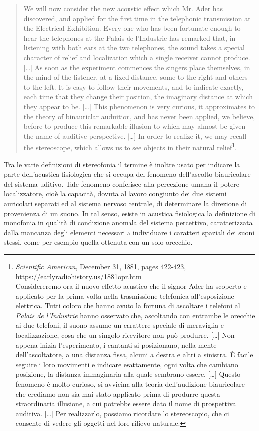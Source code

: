 \begin{quote}
We will now consider the new acoustic effect which Mr. Ader has discovered, and
applied for the first time in the telephonic transmission at the Electrical
Exhibition. Every one who has been fortunate enough to hear the telephones at
the Palais de l'Industrie has remarked that, in listening with both ears at the
two telephones, the sound takes a special character of relief and localization
which a single receiver cannot produce. [\ldots] As soon as the experiment
commences the singers place themselves, in the mind of the listener, at a fixed
distance, some to the right and others to the left. It is easy to follow their
movements, and to indicate exactly, each time that they change their position,
the imaginary distance at which they appear to be. [\ldots] This phenomenon is
very curious, it approximates to the theory of binauriclar auduition, and has
never been applied, we believe, before to produce this remarkable illusion to
which may almost be given the name of auditive perspective. [\ldots] In order
to realize it, we may recall the stereoscope, which allows us to see objects in
their natural relief\footnote{
\emph{Scientific American}, December 31, 1881, pages 422-423,\\
\url{https://earlyradiohistory.us/1881opr.htm} \\
Considereremo ora il nuovo effetto acustico che il signor Ader ha scoperto e
applicato per la prima volta nella trasmissione telefonica all'esposizione
elettrica. Tutti coloro che hanno avuto la fortuna di ascoltare i telefoni al
\emph{Palais de l'Industrie} hanno osservato che, ascoltando con entrambe le
orecchie ai due telefoni, il suono assume un carattere speciale di meraviglia e
localizzazione, cosa che un singolo ricevitore non può produrre. [\ldots] Non
appena inizia l'esperimento, i cantanti si posizionano, nella mente
dell'ascoltatore, a una distanza fissa, alcuni a destra e altri a sinistra. È
facile seguire i loro movimenti e indicare esattamente, ogni volta che cambiano
posizione, la distanza immaginaria alla quale sembrano essere. [\ldots] Questo
fenomeno è molto curioso, si avvicina alla teoria dell'audizione biauricolare che
crediamo non sia mai stato applicato prima di produrre questa straordinaria
illusione, a cui potrebbe essere dato il nome di prospettiva auditiva. [\ldots]
Per realizzarlo, possiamo ricordare lo stereoscopio, che ci consente di vedere
gli oggetti nel loro rilievo naturale.}.
\end{quote}

Tra le varie definizioni di stereofonia il termine è inoltre usato per indicare
la parte dell’acustica fisiologica che si occupa del fenomeno dell'ascolto
biauricolare del sistema uditivo. Tale fenomeno conferisce alla percezione umana
il potere localizzatore, cioè la capacità, dovuta al lavoro congiunto dei due
sistemi auricolari separati ed al sistema nervoso centrale, di determinare la
direzione di provenienza di un suono. In tal senso, esiste in acustica
fisiologica la definizione di monofonia in qualità di condizione anomala del
sistema percettivo, caratterizzata dalla mancanza degli elementi necessari a
individuare i caratteri spaziali dei suoni stessi, come per esempio quella
ottenuta con un solo orecchio.

